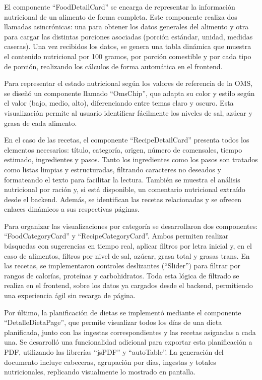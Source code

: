 El componente ``FoodDetailCard'' se encarga de representar la información nutricional de un alimento de forma completa. Este componente realiza dos llamadas asincrónicas: una para obtener los datos generales del alimento y otra para cargar las distintas porciones asociadas (porción estándar, unidad, medidas caseras). Una vez recibidos los datos, se genera una tabla dinámica que muestra el contenido nutricional por 100 gramos, por porción comestible y por cada tipo de porción, realizando los cálculos de forma automática en el frontend.

Para representar el estado nutricional según los valores de referencia de la OMS, se diseñó un componente llamado ``OmsChip'', que adapta su color y estilo según el valor (bajo, medio, alto), diferenciando entre temas claro y oscuro. Esta visualización permite al usuario identificar fácilmente los niveles de sal, azúcar y grasa de cada alimento.

En el caso de las recetas, el componente ``RecipeDetailCard'' presenta todos los elementos necesarios: título, categoría, origen, número de comensales, tiempo estimado, ingredientes y pasos. Tanto los ingredientes como los pasos son tratados como listas limpias y estructuradas, filtrando caracteres no deseados y formateando el texto para facilitar la lectura. También se muestra el análisis nutricional por ración y, si está disponible, un comentario nutricional extraído desde el backend. Además, se identifican las recetas relacionadas y se ofrecen enlaces dinámicos a sus respectivas páginas.

Para organizar las visualizaciones por categoría se desarrollaron dos componentes: ``FoodCategoryCard'' y ``RecipeCategoryCard''. Ambos permiten realizar búsquedas con sugerencias en tiempo real, aplicar filtros por letra inicial y, en el caso de alimentos, filtros por nivel de sal, azúcar, grasa total y grasas trans. En las recetas, se implementaron controles deslizantes (``Slider'') para filtrar por rangos de calorías, proteínas y carbohidratos. Toda esta lógica de filtrado se realiza en el frontend, sobre los datos ya cargados desde el backend, permitiendo una experiencia ágil sin recarga de página.

Por último, la planificación de dietas se implementó mediante el componente ``DetalleDietaPage'', que permite visualizar todos los días de una dieta planificada, junto con las ingestas correspondientes y las recetas asignadas a cada una. Se desarrolló una funcionalidad adicional para exportar esta planificación a PDF, utilizando las librerías ``jsPDF'' y ``autoTable''. La generación del documento incluye cabeceras, agrupación por días, ingestas y totales nutricionales, replicando visualmente lo mostrado en pantalla.

